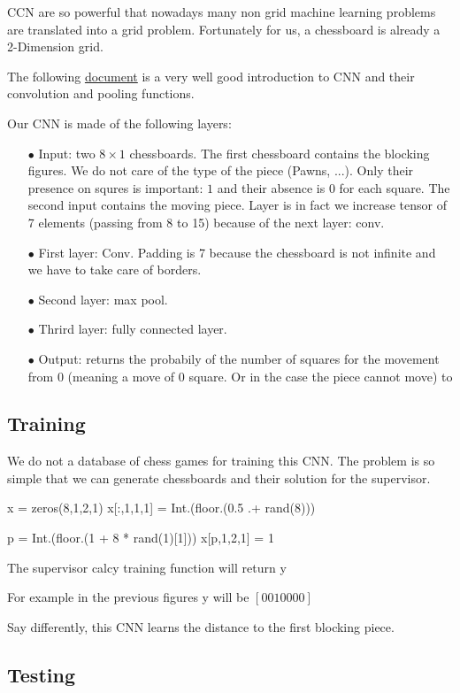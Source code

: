 \documentclass[a4paper,10pt]{article}
\begin{document}
CCN are so powerful that nowadays many non grid machine learning problems are
translated into a grid problem. Fortunately for us, a chessboard is already a
2-Dimension grid.

The following
\href{http://brohrer.github.io/how_convolutional_neural_networks_work.html}{document}
is a very well good introduction to CNN and their convolution and pooling
functions.

Our CNN is made of the following layers:
\begin{itemize}
\item[$\bullet$] Input: two $8 \times 1$ chessboards. The first chessboard
  contains the blocking figures. We do not care of the type of the piece
  (Pawns, ...). Only their presence on squres is important: $1$ and their
  absence is $0$ for each square. The second input contains the moving piece.
  Layer is in fact we increase tensor of 7 elements (passing from 8 to 15)
  because of the next layer: conv.
\item[$\bullet$] First layer: Conv. Padding is 7 because the chessboard is not
  infinite and we have to take care of borders.
\item[$\bullet$] Second layer: max pool.
\item[$\bullet$] Thrird layer: fully connected layer.
\item[$\bullet$] Output: returns the probabily of the number of squares for the
  movement from 0 (meaning a move of 0 square. Or in the case the piece cannot
  move) to
\end{itemize}

\subsection{Training}

We do not a database of chess games for training this CNN. The problem is so
simple that we can generate chessboards and their solution for the supervisor.

x = zeros(8,1,2,1)
x[:,1,1,1] = Int.(floor.(0.5 .+ rand(8)))

p = Int.(floor.(1 + 8 * rand(1)[1]))
x[p,1,2,1] = 1

The supervisor calcy training function will return y

For example in the previous figures y will be $[0 0 1 0 0 0 0]$


Say differently, this CNN learns the distance to the first blocking piece.

\subsection{Testing}
\end{document}
